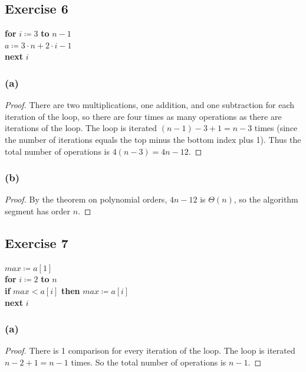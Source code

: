 \documentclass[14pt]{extarticle}
\begin{document}
\subsection{Exercise 6}
\begin{tabbing}
{\bf for} \= \(i \coloneqq 3\) {\bf to} \(n-1\) \\
          \> \(a \coloneqq 3 \cdot n + 2 \cdot i - 1\) \\
{\bf next} \(i\)
\end{tabbing}

\subsubsection{(a)}
\begin{proof}
There are two multiplications, one addition, and one subtraction for each iteration of the loop, so there are four 
times as many operations as there are iterations of the loop. The loop is iterated \((n - 1) - 3 + 1 = n - 3\) times (since 
the number of iterations equals the top minus the bottom index plus 1). Thus the total number of operations is 
\(4(n - 3) = 4n - 12\).
\end{proof}

\subsubsection{(b)}
\begin{proof}
By the theorem on polynomial orders, \(4n - 12\) is \(\Theta(n)\), so the algorithm segment has order \(n\).
\end{proof}

\subsection{Exercise 7}
\begin{tabbing}
\(max \coloneqq a[1]\) \\
{\bf for} \= \(i \coloneqq 2\) {\bf to} \(n\) \\
          \> {\bf if} \(max < a[i]\) {\bf then} \(max \coloneqq a[i]\) \\
{\bf next} \(i\)
\end{tabbing}

\subsubsection{(a)}
\begin{proof}
There is 1 comparison for every iteration of the loop. The loop is iterated \(n-2+1 = n-1\) times. So the total number of
operations is \(n-1\).
\end{proof}
\end{document}
